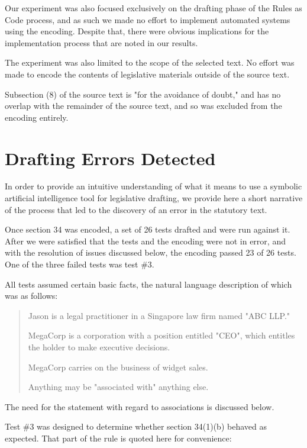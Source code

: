 \documentclass[sigconf]{acmart}
\begin{document}
Our experiment was also focused exclusively on the drafting phase of the Rules as Code process, and as such we
made no effort to implement automated systems using the encoding. Despite that, there were obvious implications
for the implementation process that are noted in our results.

The experiment was also limited to the scope of the selected text. 
No effort was made to encode the contents of
legislative materials outside of the source text.

Subsection (8) of the source text is "for the avoidance of doubt," and has no overlap with the 
remainder of the source text, and so was excluded from the encoding entirely.

\section{Drafting Errors Detected}
In order to provide an intuitive understanding of what it means to use a
symbolic artificial intelligence tool for legislative drafting, we provide here
a short narrative of the process that led to the discovery of an error in the
statutory text.

Once section 34 was encoded, a set of 26 tests drafted and were run against it.
After we were satisfied that the tests and the encoding were not in error, and 
with the resolution of issues discussed below, the encoding passed 23 of 26 tests.
One of the three failed tests was
test \#3.

All tests assumed certain basic facts, the natural language description
of which was as follows:
\begin{quote}
    Jason is a legal practitioner in a Singapore law firm named "ABC LLP."
    
    MegaCorp is a corporation with a position entitled "CEO", which entitles the holder to make
    executive decisions.
    
    MegaCorp carries on the business of widget sales.
    
    Anything may be "associated with" anything else.
\end{quote}

The need for the statement with regard to associations is discussed below.

Test \#3 was designed to determine whether section 34(1)(b) behaved as expected. That part of the rule is quoted here for convenience:
\end{document}
